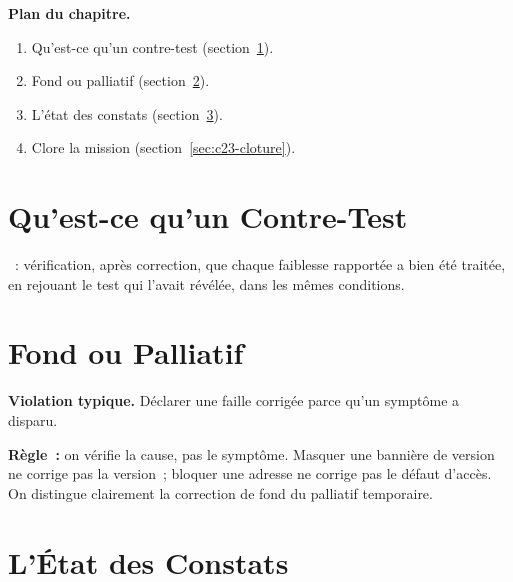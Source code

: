 \medskip
\textbf{Plan du chapitre.}
\begin{enumerate}
    \item Qu'est-ce qu'un contre-test (section~\ref{sec:c23-definition}).
    \item Fond ou palliatif (section~\ref{sec:c23-fond}).
    \item L'état des constats (section~\ref{sec:c23-etats}).
    \item Clore la mission (section~\ref{sec:c23-cloture}).
\end{enumerate}

\separateur

\section{Qu'est-ce qu'un Contre-Test}
\label{sec:c23-definition}

\begin{boxdef}
~: vérification, après correction, que chaque faiblesse
rapportée a bien été traitée, en rejouant le test qui l'avait révélée, dans
les mêmes conditions.
\end{boxdef}

\section{Fond ou Palliatif}
\label{sec:c23-fond}

\begin{boxalert}
\textbf{Violation typique.} Déclarer une faille corrigée parce qu'un symptôme
a disparu.

\smallskip
\textbf{Règle~:} on vérifie la cause, pas le symptôme. Masquer une bannière
de version ne corrige pas la version~; bloquer une adresse ne corrige pas le
défaut d'accès. On distingue clairement la correction de fond du palliatif
temporaire.
\end{boxalert}

\section{L'État des Constats}
\label{sec:c23-etats}

